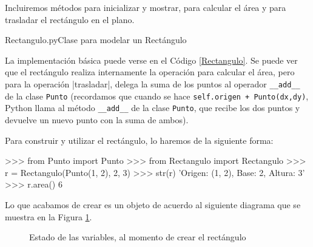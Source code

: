 Incluiremos métodos para inicializar y mostrar, para calcular el área y
para trasladar el rectángulo en el plano.

\begin{codigo}{Rectangulo.py}{Clase para modelar un Rectángulo}
\label{Rectangulo}

\end{codigo}

La implementación básica puede verse en el Código \ref{Rectangulo}.  Se
puede ver que el rectángulo realiza internamente la operación para calcular
el área, pero para la operación |trasladar|, delega la suma de los puntos
al operador \lstinline!__add__! de la clase \lstinline!Punto!
(recordamos que cuando se hace \lstinline!self.origen + Punto(dx,dy)!,
Python llama al método \lstinline!__add__! de la clase \lstinline!Punto!,
que recibe los dos puntos y devuelve un nuevo punto con la suma de ambos).

Para construir y utilizar el rectángulo, lo haremos de la siguiente forma:

\begin{codigo-python-sn}
>>> from Punto import Punto
>>> from Rectangulo import Rectangulo
>>> r = Rectangulo(Punto(1, 2), 2, 3)
>>> str(r)
'Origen: (1, 2), Base: 2, Altura: 3'
>>> r.area()
6
\end{codigo-python-sn}

Lo que acabamos de crear es un objeto de acuerdo al siguiente diagrama que
se muestra en la Figura \ref{rectangulo_punto}.

\begin{figure}[htb]
\caption{Estado de las variables, al momento de crear el rectángulo}
\label{rectangulo_punto}
\end{figure}

